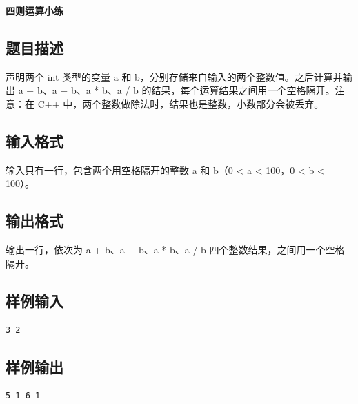 \documentclass{article}
\newcommand{\problemname}[1]{\begin{center}\Large\bfseries #1\end{center}}
\begin{document}
\problemname{四则运算小练}

\subsection*{题目描述}
声明两个 int 类型的变量 a 和 b，分别存储来自输入的两个整数值。之后计算并输出 a + b、a − b、a * b、a / b 的结果，每个运算结果之间用一个空格隔开。注意：在 C++ 中，两个整数做除法时，结果也是整数，小数部分会被丢弃。

\subsection*{输入格式}
输入只有一行，包含两个用空格隔开的整数 a 和 b（0 < a < 100，0 < b < 100）。

\subsection*{输出格式}
输出一行，依次为 a + b、a − b、a * b、a / b 四个整数结果，之间用一个空格隔开。

\subsection*{样例输入}
\begin{verbatim}
3 2
\end{verbatim}

\subsection*{样例输出}
\begin{verbatim}
5 1 6 1
\end{verbatim}
\end{document}
